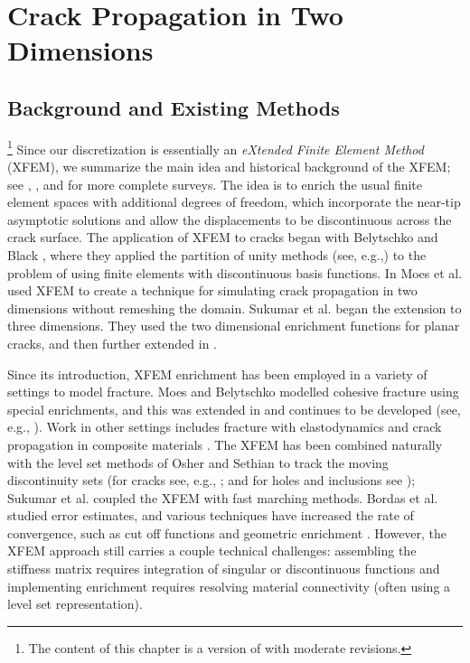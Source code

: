%

\chapter{Crack Propagation in Two Dimensions} \label{chap:partI.crackpropagation}

\section{Background and Existing Methods}

\footnote{The content of this chapter is a version of \cite{Richardson11} with moderate revisions.}
Since our discretization is essentially an \emph{eXtended Finite Element Method} (XFEM), we summarize the main idea and historical background of the XFEM; see \cite{Belytschko09}, \cite{Karihaloo03}, and \cite{Abdelaziz08} for more complete surveys. The idea is to enrich the usual finite element spaces with additional degrees of freedom, which incorporate the near-tip asymptotic solutions and allow the displacements to be discontinuous across the crack surface. The application of XFEM to cracks began with Belytschko and Black \cite{Belytschko99}, where they applied the partition of unity methods (see, e.g.,\cite{Melenk96}) to the problem of using finite elements with discontinuous basis functions. In \cite{Moes99} Moes et al. used XFEM to create a technique for simulating crack propagation in two dimensions without remeshing the domain. Sukumar et al. \cite{Sukumar00} began the extension to three dimensions. They used the two dimensional enrichment functions for planar cracks, and then further extended in \cite{Areias05}.

Since its introduction, XFEM enrichment has been employed in a variety of settings to model fracture. Moes and Belytschko \cite{Moes02b} modelled cohesive fracture using special enrichments, and this was extended in \cite{Zi.Goangseup03} and continues to be developed (see, e.g., \cite{Mariani03, Borst04, Asferg07}). Work in other settings includes fracture with elastodynamics \cite{Belytschko04} and crack propagation in composite materials \cite{Huynh09}. The XFEM has been combined naturally with the level set methods of Osher and Sethian \cite{Osher88, Osher04} to track the moving discontinuity sets (for cracks see, e.g., \cite{Belytschko01, Moes02a, Gravouil02, Duflot07, Prabel07}; and for holes and inclusions see \cite{Sukumar01}); Sukumar et al. \cite{Sukumar08} coupled the XFEM with fast marching methods. Bordas et al. \cite{Bordas07} studied error estimates, and various techniques have increased the rate of convergence, such as cut off functions and geometric enrichment \cite{Chahine06, Chahine08, Shen09}. However, the XFEM approach still carries a couple technical challenges: assembling the stiffness matrix requires integration of singular or discontinuous functions and implementing enrichment requires resolving material connectivity (often using a level set representation).

